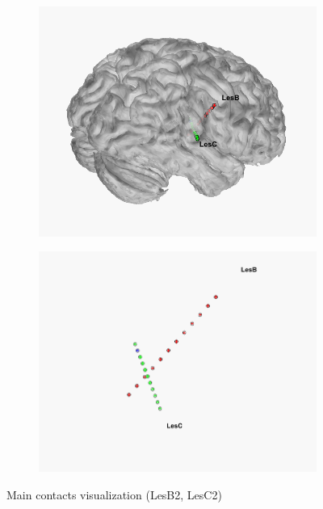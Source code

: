 \documentclass[11pt,oneside]{amsart}
\begin{document}
     \begin{figure}[H]
        \centering
        \begin{subfigure}[H]{.4\textwidth}
          \centering
          \includegraphics[width=\linewidth]{figures/les_contacts.png}
          \label{fig:sub-first}
        \end{subfigure}
        \begin{subfigure}[H]{.42\textwidth}
          \centering
          \includegraphics[width=\linewidth]{figures/lesc2.png}  
          \label{fig:sub-second}
        \end{subfigure}
        \caption{Main contacts visualization (LesB2, LesC2)}
        \label{fig:fig8}
      \end{figure}
      
\end{document}
